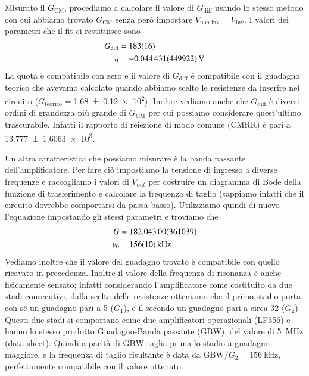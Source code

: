 \documentclass[
    rmp,
    reprint, 
    superscriptaddress, 
    altaffilletter, 
    amsmath, 
    amssymb,
    a4paper]{revtex4-2}
\begin{document}
Misurato il $G_{\text{CM}}$, procediamo a calcolare il valore di $G_{\text{diff}}$ usando lo stesso metodo con cui abbiamo trovato $G_{\text{CM}}$ senza però impostare $V_{\text{non-inv}}=V_{\text{inv}}$. I valori dei parametri che il fit ci restituisce sono
\begin{align*}
    G_{\text{diff}} &=\num[round-mode=none]{183+-16} \\
    q &=\SI{-0.044431+-0.449922}{\volt} \\
\end{align*}
La quota è compatibile con zero e il valore di $G_{\text{diff}}$ è compatibile con il guadagno teorico che avevamo calcolato quando abbiamo scelto le resistenze da inserire nel circuito ($G_{\text{teorico}}=$\num{1.68 +- 0.12e2}). Inoltre vediamo anche che $G_{\text{diff}}$ è diversi ordini di grandezza più grande di $G_{\text{CM}}$ per cui possiamo considerare quest'ultimo trascurabile. Infatti il rapporto di reiezione di modo comune (CMRR) è pari a \num{13.777+-1.6063e3}.

Un altra caratteristica che possiamo misurare è la banda passante dell'amplificatore. Per fare ciò impostiamo la tensione di ingresso a diverse frequenze e raccogliamo i valori di $V_{out}$ per costruire un diagramma di Bode della funzione di trasferimento e calcolare la frequenza di taglio (sappiamo infatti che il circuito dovrebbe comportarsi da passa-basso). Utilizziamo quindi di nuovo l'equazione  impostando gli stessi parametri e troviamo che 
\begin{align*}
    G     &=\num{ 182.043 +-  3.61039} \\
    \nu_0 &=\SI[round-mode=none]{ 156 +-  10}{\kilo\hertz} \\ 
\end{align*}
Vediamo inoltre che il valore del guadagno trovato è compatibile con quello ricavato in precedenza. 
Inoltre il valore della frequenza di risonanza è anche fisicamente sensato; infatti considerando l'amplificatore come costituito da due stadi consecutivi, dalla scelta delle resistenze otteniamo che il primo stadio porta con sé un guadagno pari a 5 ($G_{1}$), e il secondo un guadagno pari a circa 32 ($G_{2}$). Questi due stadi si comportano come due amplificatori operazionali (LF356) e hanno lo stesso prodotto Guadagno-Banda passante (GBW), del valore di \SI{5}{\mega\hertz} (data-sheet). Quindi a parità di GBW taglia prima lo stadio a guadagno maggiore, e la frequenza di taglio risultante è data da $\text{GBW}/G_{2} = \SI{156}{\kilo\hertz}$, perfettamente compatibile con il valore ottenuto.
\end{document}
